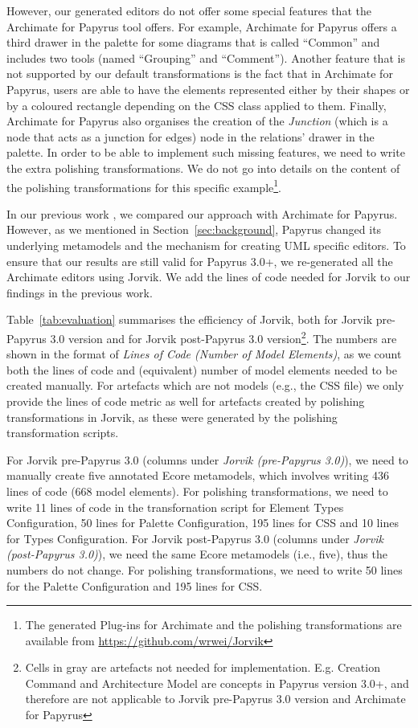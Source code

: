 However, our generated editors do not offer some special features that the Archimate for Papyrus tool offers. 
For example, Archimate for Papyrus offers a third drawer in the palette for some diagrams that is called ``Common'' and includes two tools (named ``Grouping'' and ``Comment''). 
Another feature that is not supported by our default transformations is the fact that in Archimate for Papyrus, users are able to have the elements represented either by their shapes or by a coloured rectangle depending on the CSS class applied to them. 
Finally, Archimate for Papyrus also organises the creation of the \textit{Junction} (which is a node that acts as a junction for edges) node in the relations' drawer in the palette.
In order to be able to implement such missing features, we need to write the extra polishing transformations. 
We do not go into details on the content of the polishing transformations for this specific example\footnote{The generated Plug-ins for Archimate and the polishing transformations are available from \url{https://github.com/wrwei/Jorvik}}.

In our previous work \cite{zolotas2018towards}, we compared our approach with Archimate for Papyrus. 
However, as we mentioned in Section~\ref{sec:background}, Papyrus changed its underlying metamodels and the mechanism for creating UML specific editors. 
To ensure that our results are still valid for Papyrus 3.0+, we re-generated all the Archimate editors using Jorvik. 
We add the lines of code needed for Jorvik to our findings in the previous work.

Table~\ref{tab:evaluation} summarises the efficiency of Jorvik, both for Jorvik pre-Papyrus 3.0 version and for Jorvik post-Papyrus 3.0 version\footnote{Cells in gray are artefacts not needed for implementation. E.g. Creation Command and Architecture Model are concepts in Papyrus version 3.0+, and therefore are not applicable to Jorvik pre-Papyrus 3.0 version and Archimate for Papyrus}. The numbers are shown in the format of \textit{Lines of Code (Number of Model Elements)}, as we count both the lines of code and (equivalent) number of model elements needed to be created manually. For artefacts which are not models (e.g., the CSS file) we only provide the lines of code metric as well for artefacts created by polishing transformations in Jorvik, as these were generated by the polishing transformation scripts.

For Jorvik pre-Papyrus 3.0 (columns under \textit{Jorvik (pre-Papyrus 3.0)}), we need to manually create five annotated Ecore metamodels, which involves writing 436 lines of code (668 model elements). 
For polishing transformations, we need to write 11 lines of code in the transfornation script for Element Types Configuration, 50 lines for Palette Configuration, 195 lines for CSS and 10 lines for Types Configuration.
For Jorvik post-Papyrus 3.0 (columns under \textit{Jorvik (post-Papyrus 3.0)}), we need the same Ecore metamodels (i.e., five), thus the numbers do not change. 
For polishing transformations, we need to write 50 lines for the Palette Configuration and 195 lines for CSS. 

